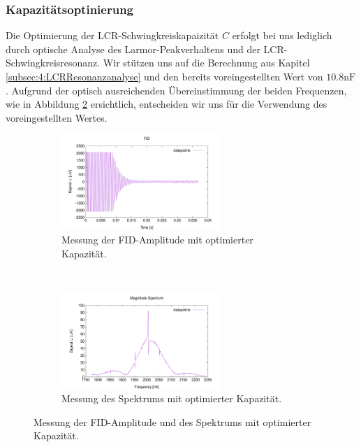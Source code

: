 \documentclass{article}
\begin{document}
        \subsubsection*{Kapazitätsoptinierung}\label{subsubsec:5:Kapazitaetsoptimierung}
            Die Optimierung der LCR-Schwingkreiskapaizität $C$ erfolgt bei uns lediglich durch optische Analyse des Larmor-Peakverhaltens und der LCR-Schwingkreisresonanz. Wir stützen uns auf die Berechnung aus Kapitel \ref{subsec:4:LCRResonanzanalyse} und den bereits voreingestellten Wert von $10.8\si{\nano\farad}$. Aufgrund der optisch ausreichenden Übereinstimmung der beiden Frequenzen, wie in Abbildung \ref{fig:5:OptiCSpectrum} ersichtlich, entscheiden wir uns für die Verwendung des voreingestellten Wertes.
            \begin{figure}[H]
                \centering
                \begin{subfigure}[t]{0.45\textwidth}
                    \centering
                    \includegraphics[width=6cm]{../Bilddateien/C_Opti_FID.png}
                    \caption{Messung der FID-Amplitude mit optimierter Kapazität.}
                \end{subfigure}
                \
                \begin{subfigure}[t]{0.45\textwidth}
                    \centering
                    \includegraphics[width=6cm]{../Bilddateien/C_Opti_Spectrum.png}
                    \caption{Messung des Spektrums mit optimierter Kapazität.}
                    \label{subfig:5:OptiCSpectrum}
                \end{subfigure}
                \caption{Messung der FID-Amplitude und des Spektrums mit optimierter Kapazität.}
                \label{fig:5:OptiCSpectrum}
            \end{figure}
\end{document}

